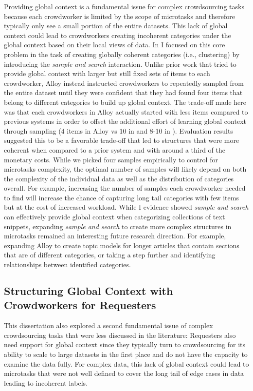 Providing global context is a fundamental issue for complex crowdsourcing tasks because each crowdworker is limited by the scope of microtasks and therefore typically only see a small portion of the entire datasets. This lack of global context could lead to crowdworkers creating incoherent categories under the global context based on their local views of data. In  I focused on this core problem in the task of creating globally coherent categories (i.e., clustering) by introducing the \emph{sample and search} interaction. Unlike prior work that tried to provide global context with larger but still fixed sets of items to each crowdworker, Alloy instead instructed crowdworkers to repeatedly sampled from the entire dataset until they were confident that they had found four items that belong to different categories to build up global context. The trade-off made here was that each crowdworkers in Alloy actually started with less items compared to previous systems in order to offset the additional effort of learning global context through sampling (4 items in Alloy vs 10 in \cite{crowdsynth} and 8-10 in \cite{cascade}). Evaluation results suggested this to be a favorable trade-off that led to structures that were more coherent when compared to a prior system \cite{cascade} and with around a third of the monetary costs. While we picked four samples empirically to control for microtasks complexity, the optimal number of samples will likely depend on both the complexity of the individual data as well as the distribution of categories overall. For example, increasing the number of samples each crowdworker needed to find will increase the chance of capturing long tail categories with few items but at the cost of increased workload. While I evidence showed \emph{sample and search} can effectively provide global context when categorizing collections of text snippets, expanding \emph{sample and search} to create more complex structures in microtasks remained an interesting future research direction. For example, expanding Alloy to create topic models for longer articles that contain sections that are of different categories, or taking a step further and identifying relationships between identified categories.

\subsection{Structuring Global Context with Crowdworkers for Requesters}

This dissertation also explored a second fundamental issue of complex crowdsourcing tasks that were less discussed in the literature: Requesters also need support for global context since they typically turn to crowdsourcing for its ability to scale to large datasets in the first place and do not have the capacity to examine the data fully. For complex data, this lack of global context could lead to microtasks that were not well defined to cover  the long tail of edge cases in data leading to incoherent labels.

